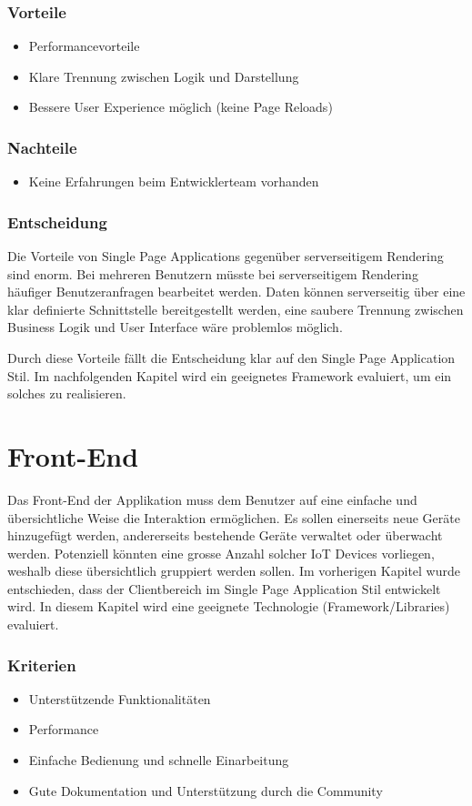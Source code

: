 \subsubsection{Vorteile}
\begin{itemize}
\item Performancevorteile
\item Klare Trennung zwischen Logik und Darstellung
\item Bessere User Experience möglich (keine Page Reloads)
\end{itemize}
\subsubsection{Nachteile}
\begin{itemize}
\item Keine Erfahrungen beim Entwicklerteam vorhanden
\end{itemize}
\subsubsection{Entscheidung}
Die Vorteile von Single Page Applications gegenüber serverseitigem Rendering sind enorm. Bei mehreren Benutzern müsste bei serverseitigem Rendering häufiger Benutzeranfragen bearbeitet werden. Daten können serverseitig über eine klar definierte Schnittstelle bereitgestellt werden, eine saubere Trennung zwischen Business Logik und User Interface wäre problemlos möglich. 

Durch diese Vorteile fällt die Entscheidung klar auf den Single Page Application Stil. Im nachfolgenden Kapitel wird ein geeignetes Framework evaluiert, um ein solches zu realisieren.  
\newpage
\section{Front-End}
Das Front-End der Applikation muss dem Benutzer auf eine einfache und übersichtliche Weise die Interaktion ermöglichen. Es sollen einerseits neue Geräte hinzugefügt werden, andererseits bestehende Geräte verwaltet oder überwacht werden. Potenziell könnten eine grosse Anzahl solcher IoT Devices vorliegen, weshalb diese übersichtlich gruppiert werden sollen. Im vorherigen Kapitel wurde entschieden, dass der Clientbereich im Single Page Application Stil entwickelt wird. In diesem Kapitel wird eine geeignete Technologie (Framework/Libraries) evaluiert. 

\subsubsection{Kriterien}
\begin{itemize}
\item Unterstützende Funktionalitäten
\item Performance
\item Einfache Bedienung und schnelle Einarbeitung
\item Gute Dokumentation und Unterstützung durch die Community
\end{itemize}

